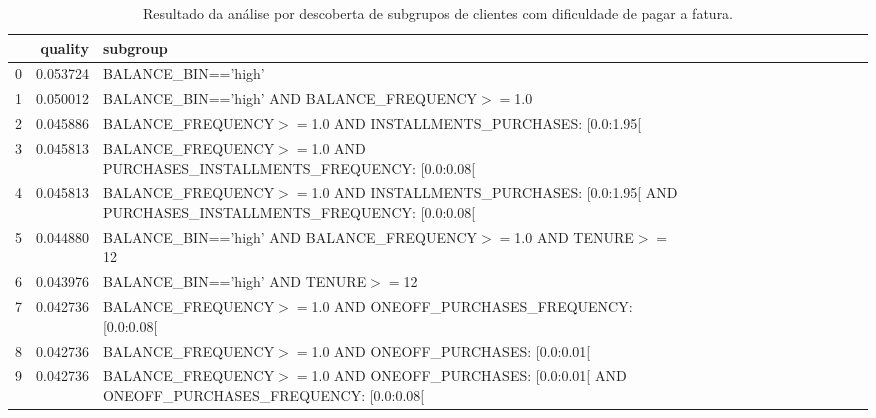 \documentclass[12pt]{article}
\begin{document}
\begin{table}
    \caption{Resultado da análise por descoberta de subgrupos de clientes com dificuldade de pagar a fatura.}
    \label{tab:res-analise}
    \resizebox{\textwidth}{!}
    {
        \begin{tabular}{lrlrrrrrrrrrrrrr}
            \toprule
              & quality  & subgroup                                                                                                             \\
            \midrule
            0 & 0.053724 & BALANCE\_BIN=='high'                                                                                                 \\
            1 & 0.050012 & BALANCE\_BIN=='high' AND BALANCE\_FREQUENCY$>=$1.0                                                                   \\
            2 & 0.045886 & BALANCE\_FREQUENCY$>=$1.0 AND INSTALLMENTS\_PURCHASES: [0.0:1.95[                                                    \\
            3 & 0.045813 & BALANCE\_FREQUENCY$>=$1.0 AND PURCHASES\_INSTALLMENTS\_FREQUENCY: [0.0:0.08[                                         \\
            4 & 0.045813 & BALANCE\_FREQUENCY$>=$1.0 AND INSTALLMENTS\_PURCHASES: [0.0:1.95[ AND PURCHASES\_INSTALLMENTS\_FREQUENCY: [0.0:0.08[ \\
            5 & 0.044880 & BALANCE\_BIN=='high' AND BALANCE\_FREQUENCY$>=$1.0 AND TENURE$>=$12                                                  \\
            6 & 0.043976 & BALANCE\_BIN=='high' AND TENURE$>=$12                                                                                \\
            7 & 0.042736 & BALANCE\_FREQUENCY$>=$1.0 AND ONEOFF\_PURCHASES\_FREQUENCY: [0.0:0.08[                                               \\
            8 & 0.042736 & BALANCE\_FREQUENCY$>=$1.0 AND ONEOFF\_PURCHASES: [0.0:0.01[                                                          \\
            9 & 0.042736 & BALANCE\_FREQUENCY$>=$1.0 AND ONEOFF\_PURCHASES: [0.0:0.01[ AND ONEOFF\_PURCHASES\_FREQUENCY: [0.0:0.08[             \\
            \bottomrule
        \end{tabular}
    }
\end{table}
\end{document}
